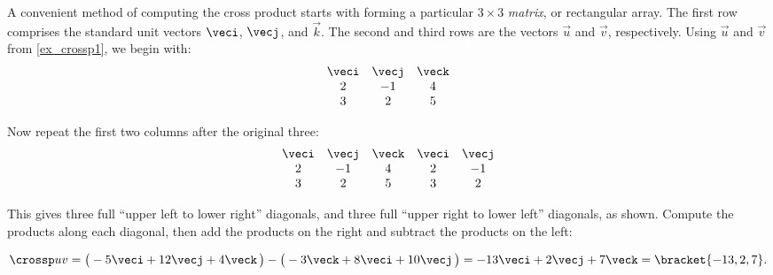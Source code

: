 A convenient method of computing the cross product starts with forming a particular $3\times 3$ \emph{matrix}, or rectangular array. The first row comprises the standard unit vectors $\veci$, $\vecj$, and $\vec k$. The second and third rows are the vectors $\vec u$ and $\vec v$, respectively. Using $\vec u$ and $\vec v$ from \autoref{ex_crossp1}, we begin with:
\[
 \begin{matrix}
  \veci&\vecj&\veck \\
  2&-1&4\\
  3&2&5
 \end{matrix}
\]

Now repeat the first two columns after the original three:
\[
 \begin{matrix}
  \veci&\vecj&\veck&\veci&\vecj \\
  2&-1&4&2&-1\\
  3&2&5&3&2
 \end{matrix}
\]

This gives three full ``upper left to lower right'' diagonals, and three full ``upper right to lower left'' diagonals, as shown. Compute the products along each diagonal, then add the products on the right and subtract the products on the left:

\begin{center}\end{center}
\[\crossp uv = \big(-5\veci+12\vecj+4\veck\,\big) - \big(-3\veck+8\veci+10\vecj\,\big) = -13\veci+2\vecj+7\veck =\bracket{-13,2,7}.\]

